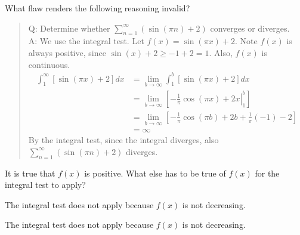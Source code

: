 \begin{question}
What flaw renders the following reasoning invalid?
\begin{quote}\color{blue}
Q: Determine whether $\displaystyle\sum_{n=1}^\infty \left(\sin(\pi n)+2\right)$ converges or diverges.\\
A: We use the integral test. Let $f(x)=\sin(\pi x)+2$. Note $f(x)$ is always positive, since $\sin(x)+2 \geq -1+2 =1$. Also, $f(x)$ is continuous.
\begin{align*}
\int_1^\infty [\sin(\pi x)+2] dx &= \lim_{b \to \infty}\int_1^b [\sin(\pi x)+2 ]dx\\
&=\lim_{b \to \infty} \left[\left.-\frac{1}{\pi}\cos(\pi x)+2x \right|_1^b\right]\\
&=\lim_{b \to \infty}\left[ -\frac{1}{\pi}\cos(\pi b)+2b +\frac{1}{\pi}(-1)-2\right]\\
&=\infty
\end{align*}
By the integral test, since the integral diverges, also $\displaystyle\sum_{n=1}^\infty\left(  \sin(\pi n)+2\right)$ diverges.
\end{quote}
\end{question}
\begin{hint}
It is true that $f(x)$ is positive. What else has to be true of $f(x)$ for the integral test to apply?
\end{hint}
\begin{answer}
The integral test does not apply because $f(x)$ is not decreasing.
\end{answer}
\begin{solution}
The integral test does not apply because $f(x)$ is not decreasing.
\end{solution}




